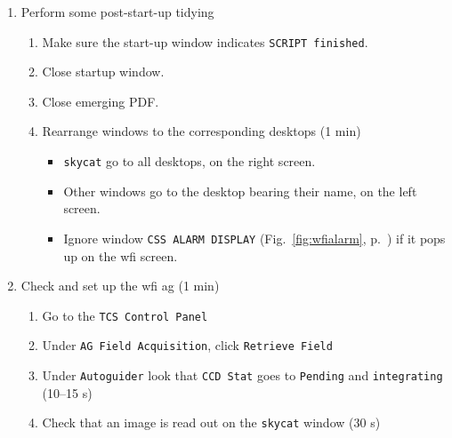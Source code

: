 \documentclass[11pt,fleqn]{book}
\def\procref#1{Procedure~\ref{proc:#1}, p.~\pageref{proc:#1}}
\def\figref#1{Fig.~\ref{fig:#1}, p.~\pageref{fig:#1}}
\begin{document}
\begin{enumerate}
\begin{enumerate}
\begin{enumerate}
\begin{enumerate}
                       If not, activate it on the FEROS screen using \texttt{fcdTelemetry} (see \procref{telemetry})
                 \item On the \texttt{Telemetry} panel, ensure that the WFI telemetry module is \texttt{active}\\
                       If not, activate it on the WFI screen using \texttt{fcdTelemetry} (see \procref{telemetry})
                 \item If a telemetry was restarted, panel must be closed and reopened (see \procref{telemetry})
                 \end{enumerate}
          \end{enumerate}
          \item Perform some post-start-up tidying
                \begin{enumerate}
                   \item Make sure the start-up window indicates \texttt{SCRIPT finished}.\label{list:tcsbooted}
                   \item Close startup window.
                   \item Close emerging PDF.
                   \item Rearrange windows to the corresponding desktops (1 min)
             \begin{itemize}
                \item \texttt{skycat} go to all desktops, on the right screen.
                \item Other windows go to the desktop bearing their name, on the left screen. 
                \item Ignore window \texttt{CSS ALARM DISPLAY} (\figref{wfialarm}) if it pops up on the \gls{wfi} screen.
             \end{itemize}     
                \end{enumerate}
          \item Check and set up the \gls{wfi} \gls{ag} (1 min)
          \begin{enumerate}
                \item Go to the \texttt{TCS Control Panel}
                \item Under \texttt{AG Field Acquisition}, click \texttt{Retrieve Field}
                \item\label{list:ccdstat} Under \texttt{Autoguider} look that \texttt{CCD Stat} goes to \texttt{Pending} and \texttt{integrating} (10--15 s)
                \item\label{list:skycatro} Check that an image is read out on the \texttt{skycat} window (30 s)

\end{enumerate}
\end{enumerate}
\end{enumerate}
\end{document}
